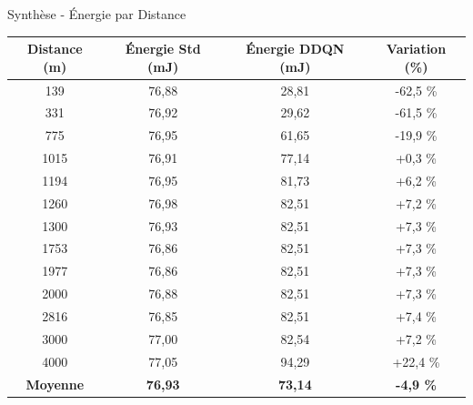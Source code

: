 \documentclass[12pt,aspectratio=169]{beamer}
\begin{document}
\begin{frame}[fragile]{Synthèse - Énergie par Distance}
	\centering
\begin{tabular}{|c|c|c|c|}
	\hline
	\textbf{Distance (m)} & \textbf{Énergie Std (mJ)} & \textbf{Énergie DDQN (mJ)} & \textbf{Variation (\%)} \\
	\hline
	139  & 76,88 & 28,81  & -62,5 \% \\
	331  & 76,92 & 29,62  & -61,5 \% \\
	775  & 76,95 & 61,65  & -19,9 \% \\
	1015 & 76,91 & 77,14  & +0,3 \% \\
	1194 & 76,95 & 81,73  & +6,2 \% \\
	1260 & 76,98 & 82,51  & +7,2 \% \\
	1300 & 76,93 & 82,51  & +7,3 \% \\
	1753 & 76,86 & 82,51  & +7,3 \% \\
	1977 & 76,86 & 82,51  & +7,3 \% \\
	2000 & 76,88 & 82,51  & +7,3 \% \\
	2816 & 76,85 & 82,51  & +7,4 \% \\
	3000 & 77,00 & 82,54  & +7,2 \% \\
	4000 & 77,05 & 94,29  & +22,4 \% \\
	\hline
	\textbf{Moyenne} & \textbf{76,93} & \textbf{73,14} & \textbf{-4,9 \%} \\
	\hline
\end{tabular}
	
	\vspace{0.3cm}
\end{frame}

\begin{frame}
	\centering
	\printbibliography
\end{frame}
\end{document}
